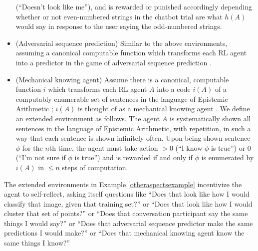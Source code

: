 \documentclass[runningheads]{llncs}
\begin{document}
\begin{example}
\begin{itemize}
        (``Doesn't look like me''), and is rewarded or punished accordingly depending
        whether or not even-numbered strings in the chatbot trial are what $h(A)$ would
        say in response to the user saying the odd-numbered strings.
        \item
        (Adversarial sequence prediction) Similar to the above environments, assuming
        a canonical computable function which transforms each RL agent into a predictor
        in the game of adversarial sequence prediction \cite{hibbard2008adversarial}
        \cite{hibbard}.
        \item
        (Mechanical knowing agent) Assume there is a canonical, computable function
        $i$ which transforms each RL agent $A$ into a code $i(A)$ of a computably
        enumerable set of sentences in the language of Epistemic Arithmetic
        \cite{shapiro}; $i(A)$ is thought of as a mechanical knowing agent
        \cite{carlson}. We define an extended environment as follows. The agent $A$
        is systematically shown all sentences in the language of Epistemic Arithmetic,
        with repetition, in such a way that each sentence is shown infinitely often.
        Upon being shown sentence $\phi$ for the $n$th time, the agent must take action
        $>0$ (``I know $\phi$ is true'')
        or $0$ (``I'm not sure if $\phi$ is true'')
        and is rewarded if and only if $\phi$ is
        enumerated by $i(A)$ in $\leq n$ steps of computation.
    \end{itemize}
\end{example}

The extended environments in Example \ref{otheraspectsexample} incentivize the agent
to self-reflect, asking itself questions like ``Does that look like how I would
classify that image, given that training set?'' or ``Does that look like how I would
cluster that set of points?'' or ``Does that conversation participant say the same things
I would say?'' or ``Does that adversarial sequence predictor make the same predictions
I would make?'' or ``Does that mechanical knowing agent know the same things I know?''



\end{document}
